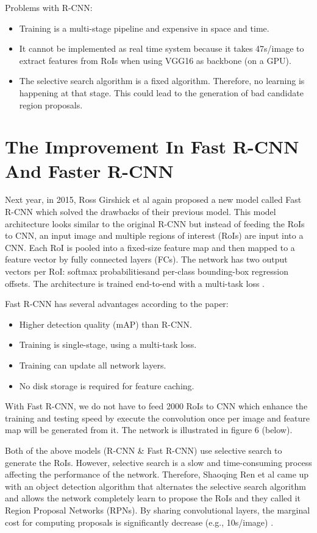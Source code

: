 	
	Problems with R-CNN:
	\begin{itemize}
		\item Training is a multi-stage pipeline and expensive in space and time.
		\item It cannot be implemented as real time system because it takes 47s/image to extract features from RoIs when using VGG16 as backbone (on a GPU).
		\item The selective search algorithm is a fixed algorithm. Therefore, no learning is happening at that stage. This could lead to the generation of bad candidate region proposals.
	\end{itemize}

\section{The Improvement In Fast R-CNN And Faster R-CNN}
\label{section:fastandfasterrcnn}
\noindent
	
	Next year, in 2015, Ross Girshick et al again proposed a new model called Fast R-CNN which solved the drawbacks of their previous model. This model architecture looks similar to the original R-CNN but instead of feeding the RoIs to CNN, an input image and multiple regions of interest (RoIs) are input into a CNN. Each RoI is pooled into a fixed-size feature map and then mapped to a feature vector by fully connected layers (FCs). The network has two output vectors per RoI: softmax probabilitiesand per-class bounding-box regression offsets. The architecture is trained end-to-end with a multi-task loss \cite{fastrcnn}.
	
	Fast R-CNN has several advantages according to the paper:
	\begin{itemize}
		\item Higher detection quality (mAP) than R-CNN.
		\item Training is single-stage, using a multi-task loss.
		\item Training can update all network layers.
		\item No disk storage is required for feature caching.
	\end{itemize}
	
	With Fast R-CNN, we do not have to feed 2000 RoIs to CNN which enhance the training and testing speed by execute the convolution once per image and feature map will be generated from it. The network is illustrated in figure 6 (below).
	
	Both of the above models (R-CNN \& Fast R-CNN) use selective search to generate the RoIs. However, selective search is a slow and time-consuming process affecting the performance of the network. Therefore, Shaoqing Ren et al came up with an object detection algorithm that alternates the selective search algorithm and allows the network completely learn to propose the RoIs and they called it Region Proposal Networks (RPNs). By sharing convolutional layers, the marginal cost for computing proposals is significantly decrease (e.g., 10s/image) \cite{fasterrcnn}.
	
